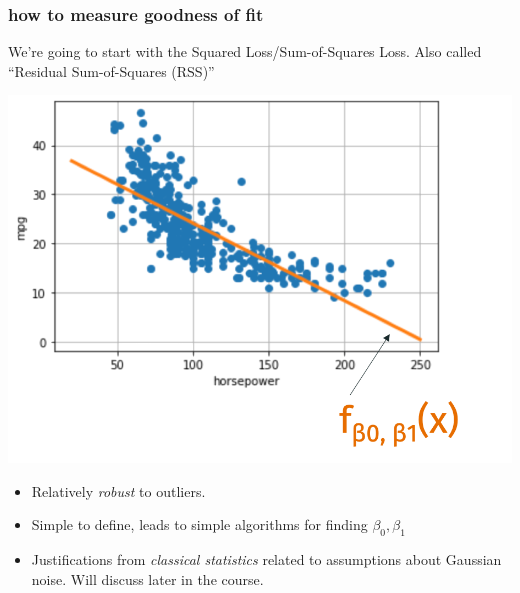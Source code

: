 \documentclass[handout,compress]{beamer}
\begin{document}
\begin{frame}
	\frametitle{how to measure goodness of fit}
	\small
	We're going to start with the Squared Loss/Sum-of-Squares Loss. Also called ``Residual Sum-of-Squares (RSS)''
	\begin{center}
		\includegraphics[width=.5\textwidth]{visualizing_fit.png}
	\end{center}
\vspace{-1em}
\begin{itemize}
	\item Relatively \emph{robust} to outliers.
	\item Simple to define, leads to simple algorithms for finding $\beta_0,\beta_1$
	\item Justifications from \emph{classical statistics} related to assumptions about Gaussian noise. Will discuss later in the course. 
\end{itemize}
\end{frame}
\end{document}
